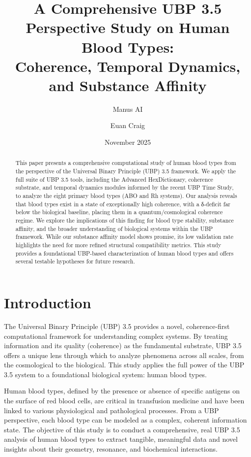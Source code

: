 \documentclass{article}
\title{A Comprehensive UBP 3.5 Perspective Study on Human Blood Types: \\ Coherence, Temporal Dynamics, and Substance Affinity}
\author{Manus AI \and Euan Craig}
\date{November 2025}
\begin{document}
\maketitle

\begin{abstract}
This paper presents a comprehensive computational study of human blood types from the perspective of the Universal Binary Principle (UBP) 3.5 framework. We apply the full suite of UBP 3.5 tools, including the Advanced HexDictionary, coherence substrate, and temporal dynamics modules informed by the recent UBP Time Study, to analyze the eight primary blood types (ABO and Rh systems). Our analysis reveals that blood types exist in a state of exceptionally high coherence, with a δ-deficit far below the biological baseline, placing them in a quantum/cosmological coherence regime. We explore the implications of this finding for blood type stability, substance affinity, and the broader understanding of biological systems within the UBP framework. While our substance affinity model shows promise, its low validation rate highlights the need for more refined structural compatibility metrics. This study provides a foundational UBP-based characterization of human blood types and offers several testable hypotheses for future research.
\end{abstract}

\section{Introduction}

The Universal Binary Principle (UBP) 3.5 provides a novel, coherence-first computational framework for understanding complex systems. By treating information and its quality (coherence) as the fundamental substrate, UBP 3.5 offers a unique lens through which to analyze phenomena across all scales, from the cosmological to the biological. This study applies the full power of the UBP 3.5 system to a foundational biological system: human blood types.

Human blood types, defined by the presence or absence of specific antigens on the surface of red blood cells, are critical in transfusion medicine and have been linked to various physiological and pathological processes. From a UBP perspective, each blood type can be modeled as a complex, coherent information state. The objective of this study is to conduct a comprehensive, real UBP 3.5 analysis of human blood types to extract tangible, meaningful data and novel insights about their geometry, resonance, and biochemical interactions.
\end{document}

